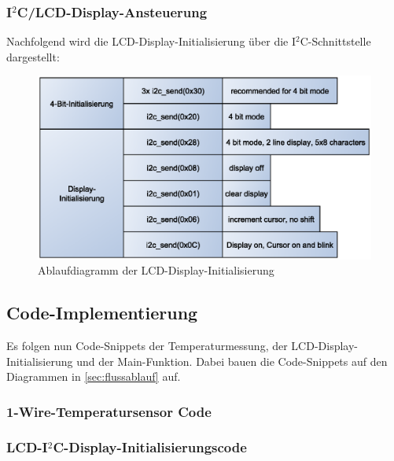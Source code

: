 \documentclass[12pt,a4paper]{article}
\begin{document}
\pagebreak

\subsubsection{I$^{2}$C/LCD-Display-Ansteuerung}
Nachfolgend wird die LCD-Display-Initialisierung über die I$^{2}$C-Schnittstelle dargestellt:

\begin{figure}[H]
	\centering
	\includegraphics[width=0.9\linewidth]{i2c_lcd_init}
	\caption{Ablaufdiagramm der LCD-Display-Initialisierung}
	\label{figure:i2c_lcd_init}
\end{figure}

\pagebreak

\subsection{Code-Implementierung}
\label{sec:codeimpref}
Es folgen nun Code-Snippets der Temperaturmessung, der LCD-Display-Initialisierung und der Main-Funktion.
Dabei bauen die Code-Snippets auf den Diagrammen in \ref{sec:flussablauf} auf.
\subsubsection{1-Wire-Temperatursensor Code}
\begin{minipage}{\textwidth}
	
\end{minipage}

\subsubsection{LCD-I$^{2}$C-Display-Initialisierungscode}
\begin{minipage}{\textwidth}
	
\end{minipage}
\end{document}

